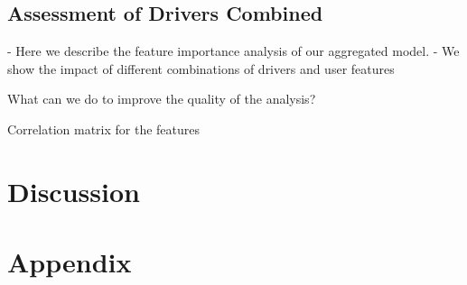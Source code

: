 \documentclass[
10pt, %
a4paper, %
oneside, %
headinclude,footinclude, %
] {book}%
\begin{document}








\section{Assessment of Drivers Combined}

- Here we describe the feature importance analysis of our aggregated model.
- We show the impact of different combinations of drivers and user features

What can we do to improve the quality of the analysis?

Correlation matrix for the features

\chapter{Discussion}
\label{conclusion}








 



\newpage
\appendix
\chapter{Appendix}
\label{appendices}
\end{document}
